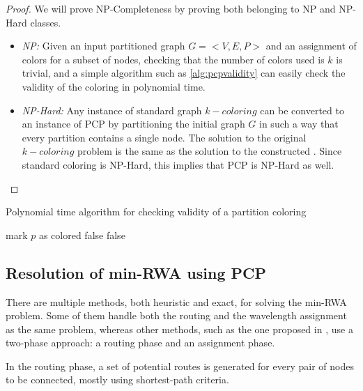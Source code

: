 \begin{proof}
We will prove NP-Completeness by proving both belonging to NP and NP-Hard classes.

\begin{itemize}
\item{\textit{NP:} Given an input partitioned graph $G = <V,E,P>$ and an assignment of colors for a subset of nodes, checking that the number of colors used is $k$ is trivial, and a simple algorithm such as \ref{alg:pcpvalidity} can easily check the validity of the coloring in polynomial time.}
\item{\textit{NP-Hard:} Any instance of standard graph $k-coloring$ can be converted to an instance of PCP by partitioning the initial graph $G$ in such a way that every partition contains a single node. The solution to the original $k-coloring$ problem is the same as the solution to the constructed \PCP{}. Since standard coloring is NP-Hard, this implies that PCP is NP-Hard as well.}
\end{itemize}

\end{proof}

\begin{algorithm}
\caption{Polynomial time algorithm for checking validity of a partition coloring}
\label{alg:pcpvalidity}
\begin{algorithmic}

			\STATE mark $p$ as colored
					\RETURN false
				\ENDIF	
			\ENDFOR
		\ENDIF
	\ENDFOR
		\RETURN false
	\ENDIF	
\ENDFOR

\end{algorithmic}
\end{algorithm}

\subsection*{Resolution of min-RWA using PCP}

There are multiple methods, both heuristic and exact, for solving the min-RWA problem. Some of them handle both the routing and the wavelength assignment as the same problem, whereas other methods, such as the one proposed in \cite{Li00thepartition}, use a two-phase approach: a routing phase and an assignment phase.

In the routing phase, a set of potential routes is generated for every pair of nodes to be connected, mostly using shortest-path criteria.

